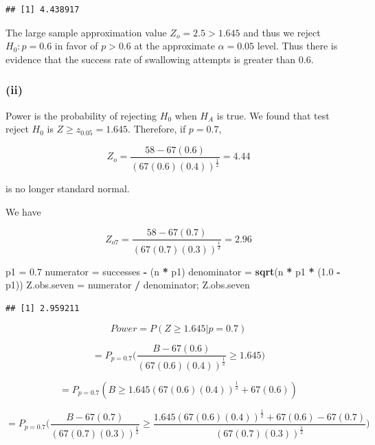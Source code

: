 \documentclass[]{article}
\newenvironment{Shaded}{\begin{snugshade}}{\end{snugshade}}
\newcommand{\FloatTok}[1]{\textcolor[rgb]{0.00,0.00,0.81}{#1}}
\newcommand{\KeywordTok}[1]{\textcolor[rgb]{0.13,0.29,0.53}{\textbf{#1}}}
\newcommand{\NormalTok}[1]{#1}
\newcommand{\OperatorTok}[1]{\textcolor[rgb]{0.81,0.36,0.00}{\textbf{#1}}}
\newcommand{\StringTok}[1]{\textcolor[rgb]{0.31,0.60,0.02}{#1}}
\begin{document}
\begin{verbatim}
## [1] 4.438917
\end{verbatim}

The large sample approximation value \(Z_o = 2.5 > 1.645\) and thus we
reject \(H_0 : p = 0.6\) in favor of \(p > 0.6\) at the approximate
\(\alpha = 0.05\) level. Thus there is evidence that the success rate of
swallowing attempts is greater than \(0.6\).

\hypertarget{ii-1}{%
\subsubsection{(ii)}\label{ii-1}}

Power is the probability of rejecting \(H_0\) when \(H_A\) is true. We
found that test reject \(H_0\) is \(Z \geq z_{0.05} = 1.645\).
Therefore, if \(p = 0.7\),

\[
    Z_o = \frac{58 - 67(0.6)}{(67(0.6)(0.4))^{\frac{1}{2}}} = 4.44
\]

is no longer standard normal.

We have

\[
    Z_{o7} = \frac{58 - 67(0.7)}{(67(0.7)(0.3))^{\frac{1}{2}}} = 2.96
\]

\begin{Shaded}
\begin{Highlighting}[]
\NormalTok{p1 =}\StringTok{ }\FloatTok{0.7}
\NormalTok{numerator =}\StringTok{ }\NormalTok{successes }\OperatorTok{-}\StringTok{ }\NormalTok{(n }\OperatorTok{*}\StringTok{ }\NormalTok{p1)}
\NormalTok{denominator =}\StringTok{ }\KeywordTok{sqrt}\NormalTok{(n }\OperatorTok{*}\StringTok{ }\NormalTok{p1 }\OperatorTok{*}\StringTok{ }\NormalTok{(}\FloatTok{1.0} \OperatorTok{-}\StringTok{ }\NormalTok{p1))}
\NormalTok{Z.obs.seven =}\StringTok{ }\NormalTok{numerator }\OperatorTok{/}\StringTok{ }\NormalTok{denominator; Z.obs.seven}
\end{Highlighting}
\end{Shaded}

\begin{verbatim}
## [1] 2.959211
\end{verbatim}

\[
    Power = P(Z \geq 1.645 | p = 0.7)
\]

\[
    = P_{p = 0.7}\bigg(\frac{B - 67(0.6)}{(67(0.6)(0.4))^{\frac{1}{2}}} \geq 1.645\bigg)
\]

\[
    = P_{p = 0.7}(B \geq 1.645(67(0.6)(0.4))^{\frac{1}{2}} + 67(0.6))
\]

\[
    = P_{p=0.7}\bigg(\frac{B - 67(0.7)}{(67(0.7)(0.3))^{\frac{1}{2}}} \geq \frac{1.645(67(0.6)(0.4))^{\frac{1}{2}} + 67(0.6) - 67(0.7)}{(67(0.7)(0.3))^{\frac{1}{2}}}\bigg)
\]
\end{document}
